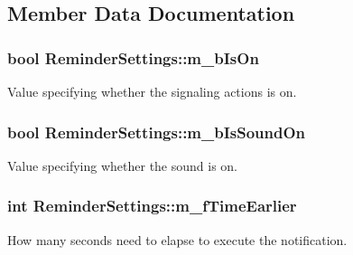 \subsection{Member Data Documentation}
\hypertarget{class_reminder_settings_a7c9b7a409f4f113d2cc2207aee5d9881}{
\subsubsection[{m\-\_\-b\-Is\-On}]{\setlength{\rightskip}{0pt plus 5cm}bool Reminder\-Settings\-::m\-\_\-b\-Is\-On\hspace{0.3cm}{\ttfamily [private]}}}\label{class_reminder_settings_a7c9b7a409f4f113d2cc2207aee5d9881}


Value specifying whether the signaling actions is on. 

\hypertarget{class_reminder_settings_ad0514a60ffede305109f60f671e721a4}{
\subsubsection[{m\-\_\-b\-Is\-Sound\-On}]{\setlength{\rightskip}{0pt plus 5cm}bool Reminder\-Settings\-::m\-\_\-b\-Is\-Sound\-On\hspace{0.3cm}{\ttfamily [private]}}}\label{class_reminder_settings_ad0514a60ffede305109f60f671e721a4}


Value specifying whether the sound is on. 

\hypertarget{class_reminder_settings_ae5a57641e84294e51aa2111c7569bc40}{
\subsubsection[{m\-\_\-f\-Time\-Earlier}]{\setlength{\rightskip}{0pt plus 5cm}int Reminder\-Settings\-::m\-\_\-f\-Time\-Earlier\hspace{0.3cm}{\ttfamily [private]}}}\label{class_reminder_settings_ae5a57641e84294e51aa2111c7569bc40}


How many seconds need to elapse to execute the notification. 

